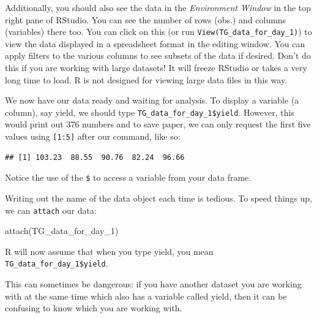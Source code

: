 \documentclass[
]{book}
\makeatletter
\newenvironment{Shaded}{\begin{snugshade}}{\end{snugshade}}
\newcommand{\DecValTok}[1]{\textcolor[rgb]{0.00,0.00,0.81}{#1}}
\newcommand{\FunctionTok}[1]{\textcolor[rgb]{0.00,0.00,0.00}{#1}}
\newcommand{\NormalTok}[1]{#1}
\newcommand{\SpecialCharTok}[1]{\textcolor[rgb]{0.00,0.00,0.00}{#1}}
\newenvironment{kframe}{%
\medskip{}
\setlength{\fboxsep}{.8em}
 \def\at@end@of@kframe{}%
 \ifinner\ifhmode%
  \def\at@end@of@kframe{\end{minipage}}%
  \begin{minipage}{\columnwidth}%
 \fi\fi%
 \def\FrameCommand##1{\hskip\@totalleftmargin \hskip-\fboxsep
 \colorbox{shadecolor}{##1}\hskip-\fboxsep
     \hskip-\linewidth \hskip-\@totalleftmargin \hskip\columnwidth}%
 \MakeFramed {\advance\hsize-\width
   \@totalleftmargin\z@ \linewidth\hsize
   \@setminipage}}%
 {\par\unskip\endMakeFramed%
 \at@end@of@kframe}
\newenvironment{rmdblock}[1]
  {
  \begin{itemize}
  \renewcommand{\labelitemi}{
    \raisebox{-.7\height}[0pt][0pt]{
      {\setkeys{Gin}{width=3em,keepaspectratio}\texttt{[image: images/\#1]}}
    }
  }
  \setlength{\fboxsep}{1em}
  \begin{kframe}
  \item
  }
  {
  \end{kframe}
  \end{itemize}
  }
\newenvironment{rmdwarning}
  {\begin{rmdblock}{warning}}
  {\end{rmdblock}}
\makeatother
\begin{document}
Additionally, you should also see the data in the \emph{Environment Window} in the top right pane of RStudio. You can see the number of rows (obs.) and columns (variables) there too. You can click on this (or run \texttt{View(TG\_data\_for\_day\_1)}) to view the data displayed in a spreadsheet format in the editing window. You can apply filters to the various columns to see subsets of the data if desired. Don't do this if you are working with large datasets! It will freeze RStudio or takes a very long time to load. R is not designed for viewing large data files in this way.

We now have our data ready and waiting for analysis. To display a variable (a column), say yield, we should type \texttt{TG\_data\_for\_day\_1\$yield}. However, this would print out 376 numbers and to save paper, we can only request the first five values using \texttt{{[}1:5{]}} after our command, like so:

\begin{Shaded}
\end{Shaded}

\begin{verbatim}
## [1] 103.23  88.55  90.76  82.24  96.66
\end{verbatim}

Notice the use of the \texttt{\$} to access a variable from your data frame.

Writing out the name of the data object each time is tedious. To speed things up, we can \texttt{attach} our data:

\begin{Shaded}
\begin{Highlighting}[]
\FunctionTok{attach}\NormalTok{(TG\_data\_for\_day\_1)}
\end{Highlighting}
\end{Shaded}

R will now assume that when you type yield, you mean \texttt{TG\_data\_for\_day\_1\$yield}.

\begin{rmdwarning}
This can sometimes be dangerous: if you have another dataset you are working with at the same time which also has a variable called yield, then it can be confusing to know which you are working with.
\end{rmdwarning}
\end{document}
